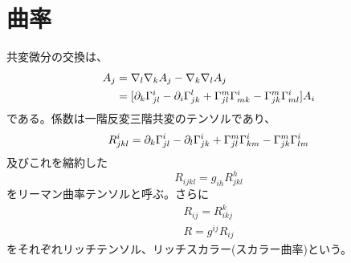     \section{曲率}
        共変微分の交換は、
        \begin{align*}
            [\na_l,\na_k]A_j &= \na_l\na_kA_j-\na_k\na_lA_j\\
            &= [\pa_k\Ga^i_{jl}-\pa_i\Ga^l_{jk}
            +\Ga^m_{jl}\Ga^i_{mk}-\Ga^m_{jk}\Ga^i_{ml}]A_i
        \end{align*}
        である。係数は一階反変三階共変のテンソルであり、
        \[R^i_{jkl}
            =\partial_k\Gamma^i_{jl}-\partial_l\Gamma^i_{jk}
            +\Gamma^m_{jl}\Gamma^i_{km}-\Gamma^m_{jk}\Gamma^i_{lm}\]
        及びこれを縮約した
            \[R_{ijkl} = g_{ih}R^h_{jkl}\]
        をリーマン曲率テンソルと呼ぶ。さらに
        \begin{gather*}
            R_{ij} = R^k_{ikj}\\
            R = g^{ij}R_{ij}
        \end{gather*}
        をそれぞれリッチテンソル、リッチスカラー(スカラー曲率)という。


